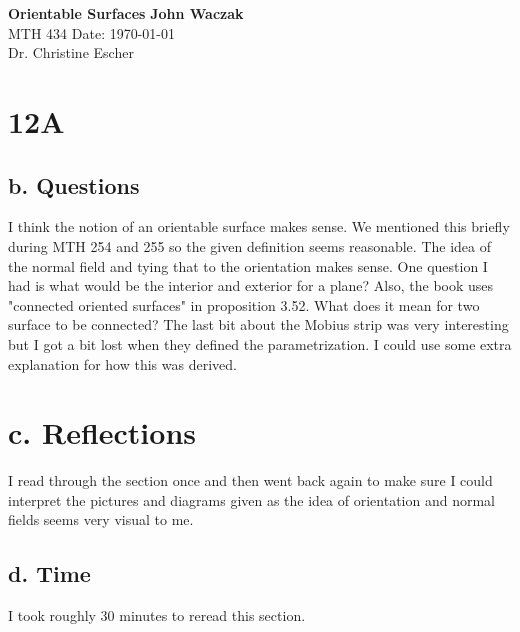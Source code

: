 \documentclass[a4paper, 11pt]{article}
\begin{document}
\noindent
\large\textbf{Orientable Surfaces} \hfill \textbf{John Waczak} \\
\normalsize MTH 434 \hfill  Date: \today \\
Dr. Christine Escher \\

\section*{12A}
	\subsection*{b. Questions}
	I think the notion of an orientable surface makes sense. We mentioned this briefly during MTH 254 and 255 so the given definition seems reasonable. The idea of the normal field and tying that to the orientation makes sense. One question I had is what would be the interior and exterior for a plane? Also, the book uses "connected oriented surfaces" in proposition 3.52. What does it mean for two surface to be connected? The last bit about the Mobius strip was very interesting but I got a bit lost when they defined the parametrization.  I could use some extra explanation for how this was derived. 
	
	\section*{c. Reflections}
	I read through the section once and then went back again to make sure I could interpret the pictures and diagrams given as the idea of orientation and normal fields seems very visual to me. 
	
	
	\subsection*{d. Time}
	I took roughly 30 minutes to reread this section. 
\end{document}
